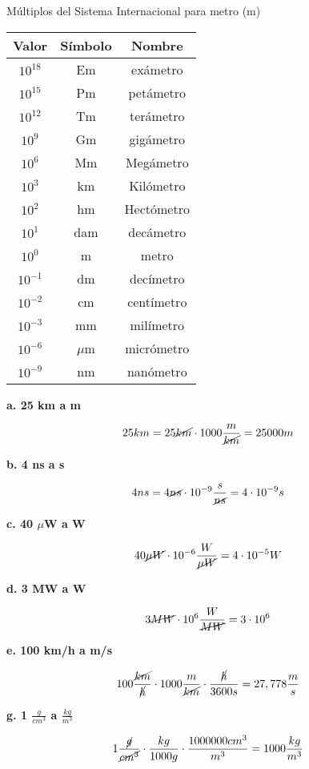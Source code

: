 \documentclass{article}
\begin{document}
Múltiplos del Sistema Internacional para metro (m)
\begin{center}
    \begin{tabular}{ c c c }
        Valor       & Símbolo  & Nombre     \\
        \hline
        \(10^{18}\) & Em       & exámetro   \\
        \(10^{15}\) & Pm       & petámetro  \\
        \(10^{12}\) & Tm       & terámetro  \\
        \(10^{9}\)  & Gm       & gigámetro  \\
        \(10^{6}\)  & Mm       & Megámetro  \\
        \(10^{3}\)  & km       & Kilómetro  \\
        \(10^{2}\)  & hm       & Hectómetro \\
        \(10^{1}\)  & dam      & decámetro  \\
        \(10^{0}\)  & m        & metro      \\
        \(10^{-1}\) & dm       & decímetro  \\
        \(10^{-2}\) & cm       & centímetro \\
        \(10^{-3}\) & mm       & milímetro  \\
        \(10^{-6}\) & \(\mu\)m & micrómetro \\
        \(10^{-9}\) & nm       & nanómetro  \\
        \hline
    \end{tabular}
\end{center}

\textbf{a. 25 km a m}

\[25 km = 25 \cancel{km} \cdot 1000 \frac{m}{\cancel{km}} = 25 000 m\]

\textbf{b. 4 ns a s}

\[4 ns = 4 \cancel{ns} \cdot 10^{-9} \frac{s}{\cancel{ns}} = 4 \cdot 10^{-9} s\]

\textbf{c. 40 \(\mu\)W a W}

\[40 \cancel{\mu W} \cdot 10^{-6} \frac{W}{\cancel{\mu W}} = 4 \cdot 10^{-5} W\]

\textbf{d. 3 MW a W}

\[3 \cancel{MW} \cdot 10^{6} \frac{W}{\cancel{MW}} = 3 \cdot 10^{6}\]

\textbf{e. 100 km/h a m/s}

\[100 \frac{\cancel{km}}{\cancel{h}} \cdot 1000 \frac{m}{\cancel{km}} \cdot \frac{\cancel{h}}{3600s} = 27,778 \frac{m}{s}\]

\textbf{g. 1 \(\frac{g}{cm^3}\) a \(\frac{kg}{m^3}\)}

\begin{equation}
    1 \frac{\cancel{g}}{\cancel{cm^3}} \cdot \frac{kg}{1000g} \cdot \frac{1000000 cm^3}{m^3} = 1000 \frac{kg}{m^3}
\end{equation}
\end{document}
